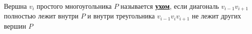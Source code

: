 \documentclass[preview]{standalone}
\begin{document}
\begin{center}
Вершна $v_i$ простого многоугольника $P$ называется \underline{\textbf{ухом}}, если диагональ $v_{i-1}v_{i+1}$ полностью лежит внутри $P$ и внутри треугольника $v_{i-1}v_{i}v_{i+1}$ не лежит других вершин $P$
\end{center}
\end{document}
